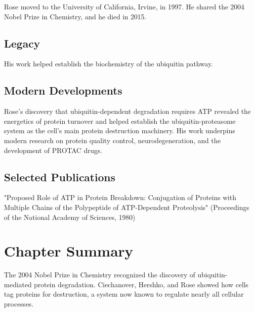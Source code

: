 Rose moved to the University of California, Irvine, in 1997. He shared the 2004 Nobel Prize in Chemistry, and he died in 2015.

\subsection*{Legacy}

His work helped establish the biochemistry of the ubiquitin pathway.

\subsection*{Modern Developments}

Rose's discovery that ubiquitin-dependent degradation requires ATP revealed the energetics of protein turnover and helped establish the ubiquitin-proteasome system as the cell's main protein destruction machinery. His work underpins modern research on protein quality control, neurodegeneration, and the development of PROTAC drugs.

\subsection*{Selected Publications}

"Proposed Role of ATP in Protein Breakdown: Conjugation of Proteins with Multiple Chains of the Polypeptide of ATP-Dependent Proteolysis" (Proceedings of the National Academy of Sciences, 1980)

\clearpage

\section*{Chapter Summary}

The 2004 Nobel Prize in Chemistry recognized the discovery of ubiquitin-mediated protein degradation. Ciechanover, Hershko, and Rose showed how cells tag proteins for destruction, a system now known to regulate nearly all cellular processes.
